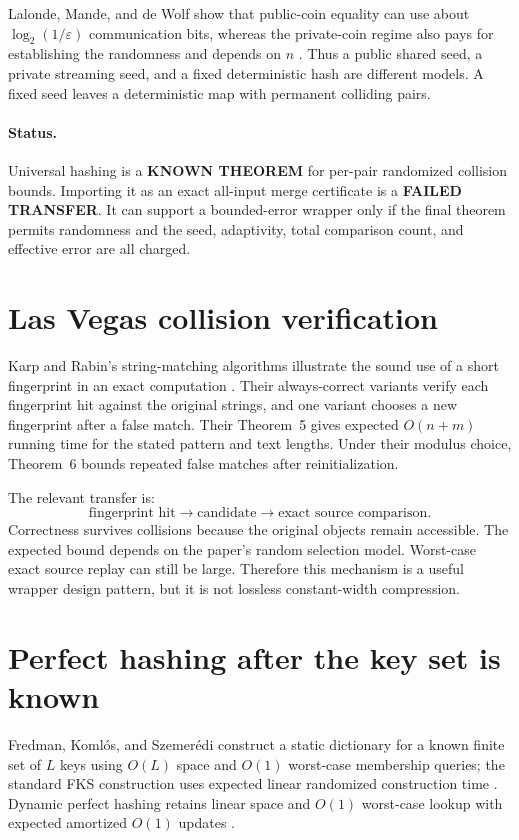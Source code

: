 \documentclass[11pt]{article}
\begin{document}
Lalonde, Mande, and de Wolf show that public-coin equality can use about
$\log_2(1/\varepsilon)$ communication bits, whereas the private-coin regime
also pays for establishing the randomness and depends on $n$
\cite{lalonde2023}.  Thus a public shared seed, a private streaming seed, and
a fixed deterministic hash are different models.  A fixed seed leaves a
deterministic map with permanent colliding pairs.

\paragraph{Status.}
Universal hashing is a \textbf{KNOWN THEOREM} for per-pair randomized
collision bounds.  Importing it as an exact all-input merge certificate is a
\textbf{FAILED TRANSFER}.  It can support a bounded-error wrapper only if the
final theorem permits randomness and the seed, adaptivity, total comparison
count, and effective error are all charged.

\section{Las Vegas collision verification}

Karp and Rabin's string-matching algorithms illustrate the sound use of a
short fingerprint in an exact computation \cite{karprabin1987}.  Their
always-correct variants verify each fingerprint hit against the original
strings, and one variant chooses a new fingerprint after a false match.
Their Theorem~5 gives expected $O(n+m)$ running time for the stated pattern
and text lengths.  Under their modulus choice, Theorem~6 bounds repeated
false matches after reinitialization.

The relevant transfer is:
\[
 \text{fingerprint hit}
 \longrightarrow
 \text{candidate}
 \longrightarrow
 \text{exact source comparison}.
 \tag{9}
\]
Correctness survives collisions because the original objects remain
accessible.  The expected bound depends on the paper's random selection
model.  Worst-case exact source replay can still be large.  Therefore this
mechanism is a useful wrapper design pattern, but it is not lossless
constant-width compression.

\section{Perfect hashing after the key set is known}

Fredman, Koml\'os, and Szemer\'edi construct a static dictionary for a known
finite set of $L$ keys using $O(L)$ space and $O(1)$ worst-case membership
queries; the standard FKS construction uses expected linear randomized
construction time \cite{fks1984}.  Dynamic perfect hashing retains linear
space and $O(1)$ worst-case lookup with expected amortized $O(1)$ updates
\cite{dietzfelbinger1994}.
\end{document}
